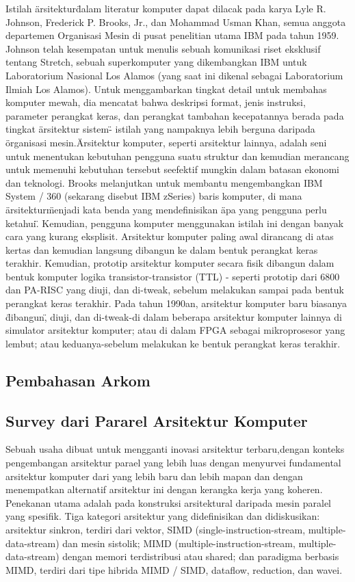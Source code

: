 Istilah \"arsitektur\" dalam literatur komputer dapat dilacak pada karya Lyle R. Johnson, Frederick P. Brooks, Jr., dan Mohammad Usman Khan, semua anggota departemen Organisasi Mesin di pusat penelitian utama IBM pada tahun 1959. Johnson telah kesempatan untuk menulis sebuah komunikasi riset eksklusif tentang Stretch, sebuah superkomputer yang dikembangkan IBM untuk Laboratorium Nasional Los Alamos (yang saat ini dikenal sebagai Laboratorium Ilmiah Los Alamos). Untuk menggambarkan tingkat detail untuk membahas komputer mewah, dia mencatat bahwa deskripsi format, jenis instruksi, parameter perangkat keras, dan perangkat tambahan kecepatannya berada pada tingkat \"arsitektur sistem\" - istilah yang nampaknya lebih berguna daripada \"organisasi mesin.\"
Arsitektur komputer, seperti arsitektur lainnya, adalah seni untuk menentukan kebutuhan pengguna suatu struktur dan kemudian merancang untuk memenuhi kebutuhan tersebut seefektif mungkin dalam batasan ekonomi dan teknologi.
Brooks melanjutkan untuk membantu mengembangkan IBM System / 360 (sekarang disebut IBM zSeries) baris komputer, di mana \"arsitektur\" menjadi kata benda yang mendefinisikan \"apa yang pengguna perlu ketahui\". Kemudian, pengguna komputer menggunakan istilah ini dengan banyak cara yang kurang eksplisit. \cite{hellige2004genese}
Arsitektur komputer paling awal dirancang di atas kertas dan kemudian langsung dibangun ke dalam bentuk perangkat keras terakhir. \cite{copeland2005alan} Kemudian, prototip arsitektur komputer secara fisik dibangun dalam bentuk komputer logika transistor-transistor (TTL) - seperti prototip dari 6800 dan PA-RISC yang diuji, dan di-tweak, sebelum melakukan sampai pada bentuk perangkat keras terakhir. Pada tahun 1990an, arsitektur komputer baru biasanya \"dibangun\", diuji, dan di-tweak-di dalam beberapa arsitektur komputer lainnya di simulator arsitektur komputer; atau di dalam FPGA sebagai mikroprosesor yang lembut; atau keduanya-sebelum melakukan ke bentuk perangkat keras terakhir. \cite{hellige2004genese}
	\subsection{Pembahasan Arkom}
	\subsection{Survey dari Pararel Arsitektur Komputer}
	Sebuah usaha dibuat untuk mengganti inovasi arsitektur terbaru,dengan konteks pengembangan arsitektur parael yang lebih luas dengan menyurvei fundamental arsitektur komputer dari yang lebih baru dan lebih mapan dan dengan menempatkan alternatif arsitektur ini dengan kerangka kerja yang koheren.
	Penekanan utama adalah pada konstruksi arsitektural daripada mesin paralel yang spesifik.
	Tiga kategori arsitektur yang didefinisikan dan didiskusikan: arsitektur sinkron, terdiri dari vektor, SIMD (single-instruction-stream, multiple-data-stream) dan mesin sistolik; MIMD (multiple-instruction-stream, multiple-data-stream) dengan memori terdistribusi atau shared; dan paradigma berbasis MIMD, terdiri dari tipe hibrida MIMD / SIMD, dataflow, reduction, dan wavei.\cite{duncan1990survey}

